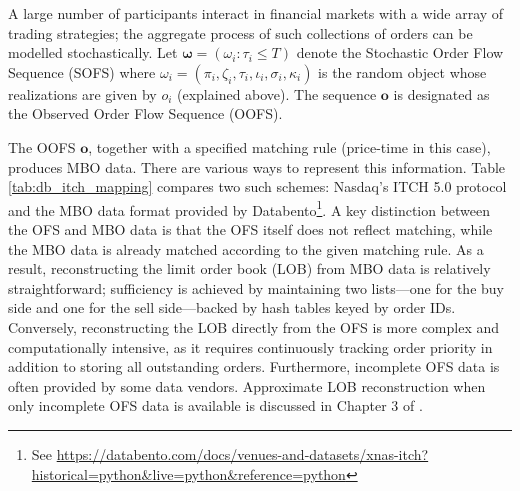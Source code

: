 \documentclass[10pt,a4paper,oneside]{article}
\begin{document}
A large number of participants interact in financial markets with a wide array of trading strategies; the aggregate process of such collections of orders can be modelled stochastically. Let $\boldsymbol{\omega} = (\omega_i : \tau_i \leq T)$ denote the Stochastic Order Flow Sequence (SOFS) where $\omega_i = (\pi_i, \zeta_i, \tau_i, \iota_i, \sigma_i, \kappa_i)$ is the random object whose realizations are given by $o_i$ (explained above). The sequence $\mathbf{o}$ is designated as the Observed Order Flow Sequence (OOFS).

The OOFS $\mathbf{o}$, together with a specified matching rule (price-time in this case), produces MBO data. There are various ways to represent this information. Table \ref{tab:db_itch_mapping} compares two such schemes: Nasdaq’s ITCH 5.0 protocol \cite{nasdaq2014itch} and the MBO data format provided by Databento\footnote{See \url{https://databento.com/docs/venues-and-datasets/xnas-itch?historical=python&live=python&reference=python}}. A key distinction between the OFS and MBO data is that the OFS itself does not reflect matching, while the MBO data is already matched according to the given matching rule. As a result, reconstructing the limit order book (LOB) from MBO data is relatively straightforward; sufficiency is achieved by maintaining two lists—one for the buy side and one for the sell side—backed by hash tables keyed by order IDs. Conversely, reconstructing the LOB directly from the OFS is more complex and computationally intensive, as it requires continuously tracking order priority in addition to storing all outstanding orders. Furthermore, incomplete OFS data is often provided by some data vendors. Approximate LOB reconstruction when only incomplete OFS data is available is discussed in Chapter 3 of \cite{richards2019modelling}.
\end{document}

